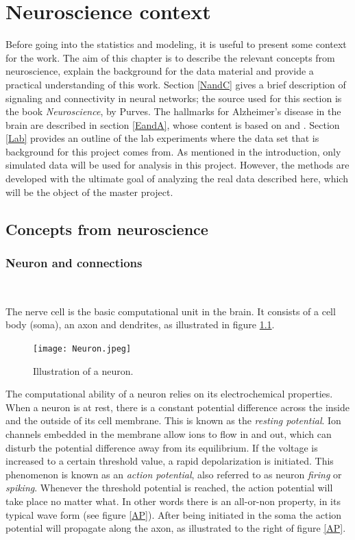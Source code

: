 
\chapter{Neuroscience context}

Before going into the statistics and modeling, it is useful to present some context for the work. The aim of this chapter is to describe the relevant concepts from neuroscience, explain the background for the data material and provide a practical understanding of this work. Section \ref{NandC} gives a brief description of signaling and connectivity in neural networks; the source used for this section is the book \textit{Neuroscience}, by Purves. The hallmarks for Alzheimer's disease in the brain are described in section \ref{EandA}, whose content is based on \cite{Gomez} and \cite{Witter:2011}. Section \ref{Lab} provides an outline of the lab experiments where the data set that is background for this project comes from. As mentioned in the introduction, only simulated data will be used for analysis in this project. However, the methods are developed with the ultimate goal of analyzing the real data described here, which will be the object of the master project. 

\section{Concepts from neuroscience}

\subsection{Neuron and connections}\\
\label{NandC}

 The nerve cell is the basic computational unit in the brain. It consists of a cell body (soma), an axon and dendrites, as illustrated in figure \ref{neuron}.
\begin{figure}[h]
    \caption{Illustration of a neuron.}
    \label{neuron}
    \centering
    \texttt{[image: Neuron.jpeg]}
\end{figure} 

The computational ability of a neuron relies on its electrochemical properties. When a neuron is at rest, there is a constant potential difference across the inside and the outside of its cell membrane. This is known as the \textit{resting potential}. Ion channels embedded in the membrane allow ions to flow in and out, which can disturb the potential difference away from its equilibrium. If the voltage is increased to a certain threshold value, a rapid depolarization is initiated. This phenomenon is known as an \textit{action potential}, also referred to as neuron \textit{firing} or \textit{spiking}. Whenever the threshold potential is reached, the action potential will take place no matter what. In other words there is an all-or-non property, in its typical wave form (see figure \ref{AP}). After being initiated in the soma the action potential will propagate along the axon, as illustrated to the right of figure \ref{AP}.


